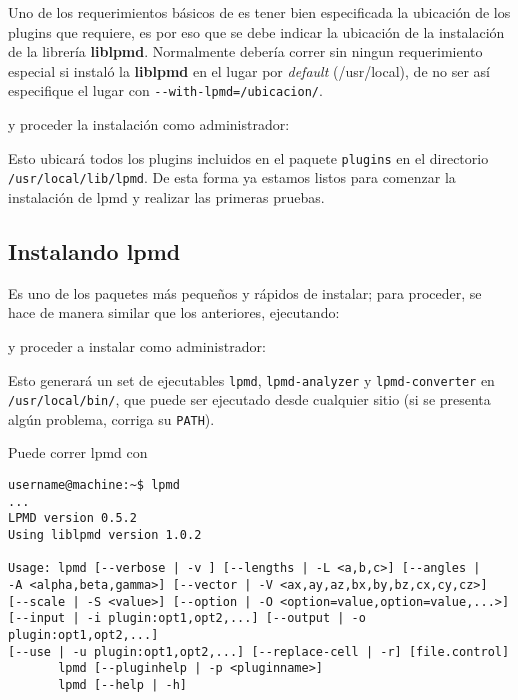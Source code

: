 Uno de los requerimientos b\'asicos de {\lpmd} es tener bien especificada la ubicaci\'on de los plugins que {\lpmd} requiere, es por eso que se debe indicar la ubicaci\'on de la instalaci\'on de la librer\'ia \textbf{liblpmd}. Normalmente deber\'ia correr sin ningun requerimiento especial si instal\'o la \textbf{liblpmd} en el lugar por \textit{default} (/usr/local), de no ser as\'i especifique el lugar con \verb|--with-lpmd=/ubicacion/|.


y proceder la instalaci\'on como administrador:


Esto ubicar\'a todos los plugins incluidos en el paquete \verb|plugins| en el directorio \verb|/usr/local/lib/lpmd|. De esta forma ya estamos listos para comenzar la instalaci\'on de lpmd y realizar las primeras pruebas.

\subsection{Instalando lpmd}

Es uno de los paquetes m\'as peque\~nos y r\'apidos de instalar; para proceder, se hace de manera similar que los anteriores, ejecutando:


y proceder a instalar como administrador:


Esto generar\'a un set de ejecutables \verb|lpmd|, \verb|lpmd-analyzer| y \verb|lpmd-converter| en \verb|/usr/local/bin/|, que puede ser ejecutado desde cualquier sitio (si se presenta alg\'un problema, corriga su \verb|PATH|).

Puede correr lpmd con

\begin{verbatim}
username@machine:~$ lpmd
...
LPMD version 0.5.2
Using liblpmd version 1.0.2

Usage: lpmd [--verbose | -v ] [--lengths | -L <a,b,c>] [--angles | 
-A <alpha,beta,gamma>] [--vector | -V <ax,ay,az,bx,by,bz,cx,cy,cz>] 
[--scale | -S <value>] [--option | -O <option=value,option=value,...>] 
[--input | -i plugin:opt1,opt2,...] [--output | -o plugin:opt1,opt2,...] 
[--use | -u plugin:opt1,opt2,...] [--replace-cell | -r] [file.control]
       lpmd [--pluginhelp | -p <pluginname>]
       lpmd [--help | -h]
\end{verbatim}

